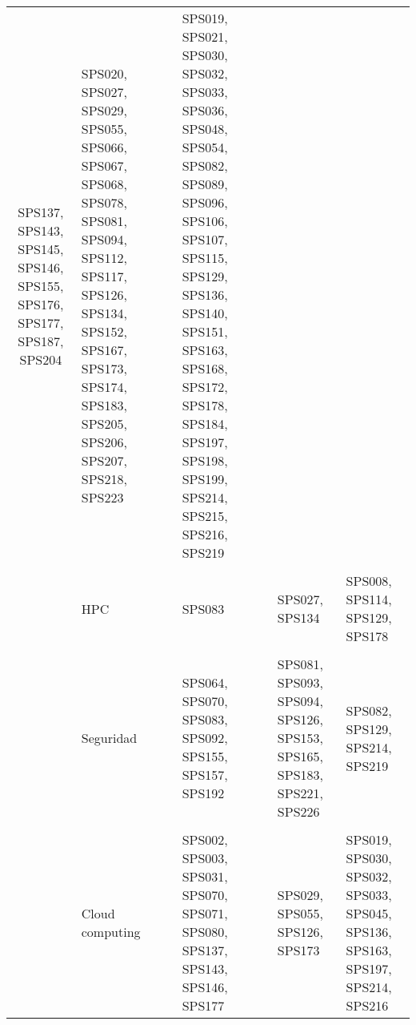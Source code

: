 \begin{longtable}{c Z Y Y Y}
SPS137, SPS143, SPS145, SPS146, SPS155, SPS176, SPS177, SPS187, SPS204 & SPS020, SPS027, SPS029, SPS055, SPS066, SPS067, SPS068, SPS078, SPS081, SPS094, SPS112, SPS117, SPS126, SPS134, SPS152, SPS167, SPS173, SPS174, SPS183, SPS205, SPS206, SPS207, SPS218, SPS223 & SPS019, SPS021, SPS030, SPS032, SPS033, SPS036, SPS048, SPS054, SPS082, SPS089, SPS096, SPS106, SPS107, SPS115, SPS129, SPS136, SPS140, SPS151, SPS163, SPS168, SPS172, SPS178, SPS184, SPS197, SPS198, SPS199, SPS214, SPS215, SPS216, SPS219 \\\\ & HPC & SPS083 & SPS027, SPS134 & SPS008, SPS114, SPS129, SPS178 \\\\ & Seguridad & SPS064, SPS070, SPS083, SPS092, SPS155, SPS157, SPS192 & SPS081, SPS093, SPS094, SPS126, SPS153, SPS165, SPS183, SPS221, SPS226 & SPS082, SPS129, SPS214, SPS219 \\\\ & Cloud computing & SPS002, SPS003, SPS031, SPS070, SPS071, SPS080, SPS137, SPS143, SPS146, SPS177 & SPS029, SPS055, SPS126, SPS173 & SPS019, SPS030, SPS032, SPS033, SPS045, SPS136, SPS163, SPS197, SPS214, SPS216 \\ \bottomrule
\end{longtable}

\twocolumn